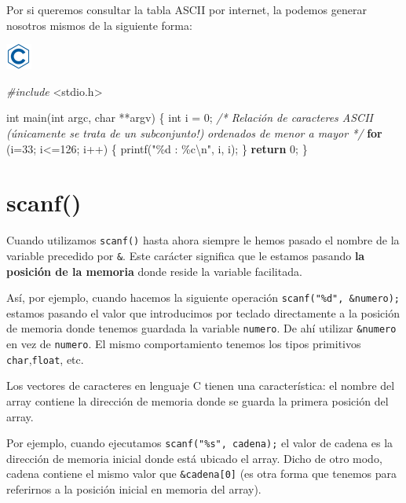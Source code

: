 \documentclass[
]{book}
\newenvironment{Shaded}{\begin{snugshade}}{\end{snugshade}}
\newcommand{\CommentTok}[1]{\textcolor[rgb]{0.56,0.35,0.01}{\textit{#1}}}
\newcommand{\ControlFlowTok}[1]{\textcolor[rgb]{0.13,0.29,0.53}{\textbf{#1}}}
\newcommand{\DataTypeTok}[1]{\textcolor[rgb]{0.13,0.29,0.53}{#1}}
\newcommand{\DecValTok}[1]{\textcolor[rgb]{0.00,0.00,0.81}{#1}}
\newcommand{\ImportTok}[1]{#1}
\newcommand{\NormalTok}[1]{#1}
\newcommand{\PreprocessorTok}[1]{\textcolor[rgb]{0.56,0.35,0.01}{\textit{#1}}}
\newcommand{\SpecialCharTok}[1]{\textcolor[rgb]{0.00,0.00,0.00}{#1}}
\newcommand{\StringTok}[1]{\textcolor[rgb]{0.31,0.60,0.02}{#1}}
\begin{document}
Por si queremos consultar la tabla ASCII por internet, la podemos generar nosotros mismos de la siguiente forma:

\includegraphics{./img/c.png}

\begin{Shaded}
\begin{Highlighting}[]
\PreprocessorTok{\#include }\ImportTok{\textless{}stdio.h\textgreater{}}

\DataTypeTok{int}\NormalTok{ main(}\DataTypeTok{int}\NormalTok{ argc, }\DataTypeTok{char}\NormalTok{ **argv) \{}
    \DataTypeTok{int}\NormalTok{ i = }\DecValTok{0}\NormalTok{;}
    \CommentTok{/* Relación de caracteres ASCII (únicamente se trata de un subconjunto!)}
\CommentTok{       ordenados de menor a mayor */}
    \ControlFlowTok{for}\NormalTok{ (i=}\DecValTok{33}\NormalTok{; i\textless{}=}\DecValTok{126}\NormalTok{; i++) \{}
\NormalTok{        printf(}\StringTok{"\%d : \%c}\SpecialCharTok{\textbackslash{}n}\StringTok{"}\NormalTok{, i, i);}
\NormalTok{    \}}
    \ControlFlowTok{return} \DecValTok{0}\NormalTok{;}
\NormalTok{\}}
\end{Highlighting}
\end{Shaded}

\hypertarget{scanf}{%
\section{scanf()}\label{scanf}}

Cuando utilizamos \texttt{scanf()} hasta ahora siempre le hemos pasado el nombre de la variable precedido por \texttt{\&}. Este carácter significa que le estamos pasando \textbf{la posición de la memoria} donde reside la variable facilitada.

Así, por ejemplo, cuando hacemos la siguiente operación \texttt{scanf("\%d",\ \&numero);} estamos pasando el valor que introducimos por teclado directamente a la posición de memoria donde tenemos guardada la variable \texttt{numero}. De ahí utilizar \texttt{\&numero} en vez de \texttt{numero}. El mismo comportamiento tenemos los tipos primitivos \texttt{char},\texttt{float}, etc.

Los vectores de caracteres en lenguaje C tienen una característica: el nombre del array contiene la dirección de memoria donde se guarda la primera posición del array.

Por ejemplo, cuando ejecutamos \texttt{scanf("\%s",\ cadena);} el valor de cadena es la dirección de memoria inicial donde está ubicado el array. Dicho de otro modo, cadena contiene el mismo valor que \texttt{\&cadena{[}0{]}} (es otra forma que tenemos para referirnos a la posición inicial en memoria del array).
\end{document}
